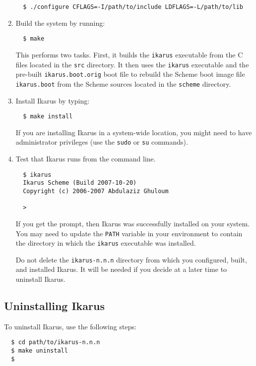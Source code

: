 \documentclass[onecolumn, 12pt, twoside, openright, dvipdfm]{book}
\begin{document}
\begin{enumerate}
\begin{verbatim}
  $ ./configure CFLAGS=-I/path/to/include LDFLAGS=-L/path/to/lib
\end{verbatim}

\item Build the system by running:
\begin{verbatim}
  $ make
\end{verbatim}
This performs two
tasks.  First, it builds the \texttt{ikarus} executable from the C
files located in the \texttt{src} directory.  It then uses the
\texttt{ikarus} executable and the pre-built
\texttt{ikarus.boot.orig} boot file to rebuild the Scheme boot image
file \texttt{ikarus.boot} from the Scheme sources located in the
\texttt{scheme} directory.

\item Install Ikarus by typing:
\begin{verbatim}
  $ make install
\end{verbatim}
If you are installing Ikarus in a system-wide location, you might
need to have administrator privileges (use the \texttt{sudo} or
\texttt{su} commands).

\item Test that Ikarus runs from the command line.
\begin{verbatim}
  $ ikarus
  Ikarus Scheme (Build 2007-10-20)
  Copyright (c) 2006-2007 Abdulaziz Ghuloum

  > 
\end{verbatim}
If you get the prompt, then Ikarus was successfully installed on
your system.  You may need to update the \texttt{PATH} variable in
your environment to contain the directory in which the
\texttt{ikarus} executable was installed.

Do not delete the \texttt{ikarus-n.n.n} directory from which you
configured, built, and installed Ikarus.  It will be needed if you
decide at a later time to uninstall Ikarus.

\end{enumerate}

\subsection{Uninstalling Ikarus}

To uninstall Ikarus, use the following steps:

\begin{verbatim}
  $ cd path/to/ikarus-n.n.n
  $ make uninstall
  $
\end{verbatim}
\end{document}
